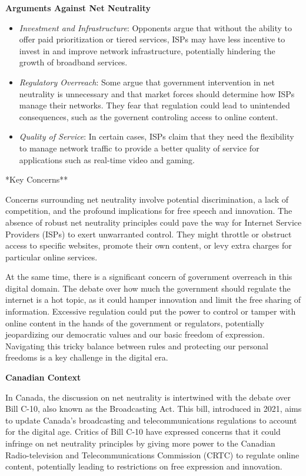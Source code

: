 \documentclass[
]{book}
\providecommand{\tightlist}{%
  \setlength{\itemsep}{0pt}\setlength{\parskip}{0pt}}
\theoremstyle{definition}
\theoremstyle{definition}
\theoremstyle{definition}
\theoremstyle{definition}
\theoremstyle{remark}
\begin{document}
\textbf{Arguments Against Net Neutrality}

\begin{itemize}
\tightlist
\item
  \emph{Investment and Infrastructure}: Opponents argue that without the ability to offer paid prioritization or tiered services, ISPs may have less incentive to invest in and improve network infrastructure, potentially hindering the growth of broadband services.\\
\item
  \emph{Regulatory Overreach}: Some argue that government intervention in net neutrality is unnecessary and that market forces should determine how ISPs manage their networks. They fear that regulation could lead to unintended consequences, such as the governent controling access to online content.\\
\item
  \emph{Quality of Service}: In certain cases, ISPs claim that they need the flexibility to manage network traffic to provide a better quality of service for applications such as real-time video and gaming.
\end{itemize}

*Key Concerns**

Concerns surrounding net neutrality involve potential discrimination, a lack of competition, and the profound implications for free speech and innovation. The absence of robust net neutrality principles could pave the way for Internet Service Providers (ISPs) to exert unwarranted control. They might throttle or obstruct access to specific websites, promote their own content, or levy extra charges for particular online services.

At the same time, there is a significant concern of government overreach in this digital domain. The debate over how much the government should regulate the internet is a hot topic, as it could hamper innovation and limit the free sharing of information. Excessive regulation could put the power to control or tamper with online content in the hands of the government or regulators, potentially jeopardizing our democratic values and our basic freedom of expression. Navigating this tricky balance between rules and protecting our personal freedoms is a key challenge in the digital era.

\textbf{Canadian Context}

In Canada, the discussion on net neutrality is intertwined with the debate over Bill C-10, also known as the Broadcasting Act. This bill, introduced in 2021, aims to update Canada's broadcasting and telecommunications regulations to account for the digital age. Critics of Bill C-10 have expressed concerns that it could infringe on net neutrality principles by giving more power to the Canadian Radio-television and Telecommunications Commission (CRTC) to regulate online content, potentially leading to restrictions on free expression and innovation.
\end{document}
